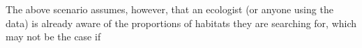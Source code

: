 
The above scenario assumes, however, that an ecologist (or anyone using the data) is already aware of the proportions of habitats they are searching for, which may not be the case if 

